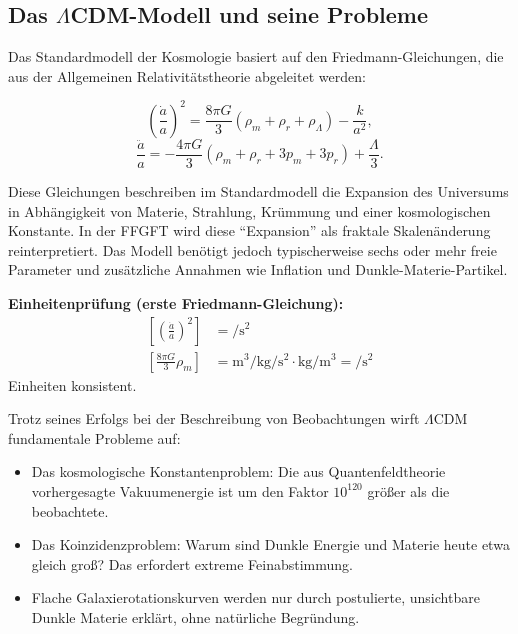 	
	
	\subsection*{Das $\Lambda$CDM-Modell und seine Probleme}
	
	Das Standardmodell der Kosmologie basiert auf den Friedmann-Gleichungen, die aus der Allgemeinen Relativitätstheorie abgeleitet werden:
	
	\begin{equation}
		\left( \frac{\dot{a}}{a} \right)^2 = \frac{8\pi G}{3} (\rho_m + \rho_r + \rho_\Lambda) - \frac{k}{a^2},
	\end{equation}
	\begin{equation}
		\frac{\ddot{a}}{a} = -\frac{4\pi G}{3} (\rho_m + \rho_r + 3p_m + 3p_r) + \frac{\Lambda}{3}.
	\end{equation}
	
	Diese Gleichungen beschreiben im Standardmodell die Expansion des Universums in Abhängigkeit von Materie, Strahlung, Krümmung und einer kosmologischen Konstante. In der FFGFT wird diese \enquote{Expansion} als fraktale Skalenänderung reinterpretiert. Das Modell benötigt jedoch typischerweise sechs oder mehr freie Parameter und zusätzliche Annahmen wie Inflation und Dunkle-Materie-Partikel.
	
	\textbf{Einheitenprüfung (erste Friedmann-Gleichung):}
	\[
	\begin{aligned}
		\left[\left( \frac{\dot{a}}{a} \right)^2\right] &= \si{\per\second\squared} \\
		\left[\frac{8\pi G}{3} \rho_m\right] &= \si{\meter\cubed\per\kilo\gram\per\second\squared} \cdot \si{\kilo\gram\per\meter\cubed} = \si{\per\second\squared}
	\end{aligned}
	\]
	Einheiten konsistent.
	
	Trotz seines Erfolgs bei der Beschreibung von Beobachtungen wirft \(\Lambda\)CDM fundamentale Probleme auf:
	\begin{itemize}
		\item Das kosmologische Konstantenproblem: Die aus Quantenfeldtheorie vorhergesagte Vakuumenergie ist um den Faktor $10^{120}$ größer als die beobachtete.
		\item Das Koinzidenzproblem: Warum sind Dunkle Energie und Materie heute etwa gleich groß? Das erfordert extreme Feinabstimmung.
		\item Flache Galaxierotationskurven werden nur durch postulierte, unsichtbare Dunkle Materie erklärt, ohne natürliche Begründung.
	\end{itemize}
	
